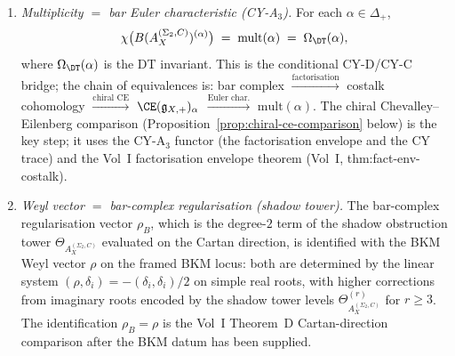 \begin{theorem}[Conditional denominator \texorpdfstring{$=$}{=} bar-complex Euler product on framed BKM loci]
\begin{enumerate}[label=\textup{(S\arabic*)}]
\item \emph{Multiplicity $=$ bar Euler characteristic \textup{(}CY-A$_3$\textup{)}.} For each $\alpha \in \Delta_+$,
\[
 \chi\bigl(B(A_X^{(\Sigma_2,C)})^{(\alpha)}\bigr) \;=\; \mathrm{mult}(\alpha) \;=\; \Omega_{\DT}(\alpha),
\]
where $\Omega_{\DT}(\alpha)$ is the DT invariant. This is the conditional
CY-D/CY-C bridge; the chain of equivalences is:
bar complex $\xrightarrow{\text{factorisation}}$ costalk cohomology $\xrightarrow{\text{chiral CE}}$ $\CE(\mathfrak{g}_{X,+})_\alpha$ $\xrightarrow{\text{Euler char.}}$ $\mathrm{mult}(\alpha)$.
The chiral Chevalley--Eilenberg comparison (Proposition~\ref{prop:chiral-ce-comparison} below) is the key step; it uses the CY-A$_3$ functor (the factorisation envelope and the CY trace) and the Vol~I factorisation envelope theorem (Vol~I, thm:fact-env-costalk).

\item \emph{Weyl vector $=$ bar-complex regularisation \textup{(}shadow tower\textup{)}.} The bar-complex regularisation vector $\rho_B$, which is the degree-$2$ term of the shadow obstruction tower $\Theta_{A_X^{(\Sigma_2,C)}}$ evaluated on the Cartan direction, is identified with the BKM Weyl vector $\rho$ on the framed BKM locus: both are determined by the linear system $(\rho, \delta_i) = -(\delta_i,\delta_i)/2$ on simple real roots, with higher corrections from imaginary roots encoded by the shadow tower levels $\Theta^{(r)}_{A_X^{(\Sigma_2,C)}}$ for $r \geq 3$. The identification $\rho_B = \rho$ is the Vol~I Theorem~D Cartan-direction comparison after the BKM datum has been supplied.
\end{enumerate}
\end{theorem}


